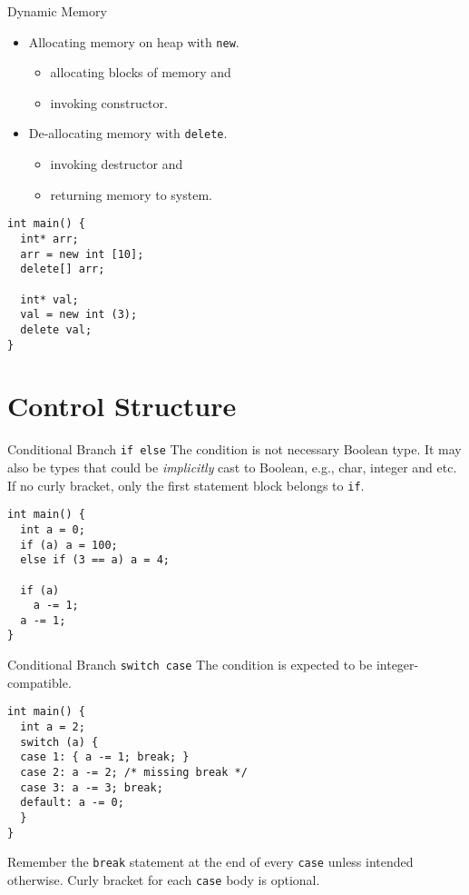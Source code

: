 \documentclass[presentation]{beamer}
\begin{document}
\begin{frame}[fragile,label={sec:orgheadline31}]{Dynamic Memory}
 \begin{itemize}
\item Allocating memory on heap with \texttt{new}.
\begin{itemize}
\item allocating blocks of memory and
\item invoking constructor.
\end{itemize}
\item De-allocating memory with \texttt{delete}.
\begin{itemize}
\item invoking destructor and
\item returning memory to system.
\end{itemize}
\end{itemize}

\begin{verbatim}
int main() {
  int* arr;
  arr = new int [10];
  delete[] arr;

  int* val;
  val = new int (3);
  delete val;
}
\end{verbatim}
\end{frame}

\section{Control Structure}
\label{sec:orgheadline39}

\begin{frame}[fragile,label={sec:orgheadline33}]{Conditional Branch \texttt{if else}}
 The condition is not necessary Boolean type.  It may also be types
that could be \emph{implicitly} cast to Boolean, e.g., char, integer and
etc.  If no curly bracket, only the first statement block belongs
to \texttt{if}.

\begin{verbatim}
int main() {
  int a = 0;
  if (a) a = 100;
  else if (3 == a) a = 4;

  if (a)
    a -= 1;
  a -= 1;
}
\end{verbatim}
\end{frame}

\begin{frame}[fragile,label={sec:orgheadline34}]{Conditional Branch \texttt{switch case}}
 The condition is expected to be integer-compatible.

\begin{verbatim}
int main() {
  int a = 2;
  switch (a) {
  case 1: { a -= 1; break; }
  case 2: a -= 2; /* missing break */
  case 3: a -= 3; break;
  default: a -= 0;
  }
}
\end{verbatim}

Remember the \texttt{break} statement at the end of every \texttt{case} unless
intended otherwise.  Curly bracket for each \texttt{case} body is
optional.
\end{frame}
\end{document}
